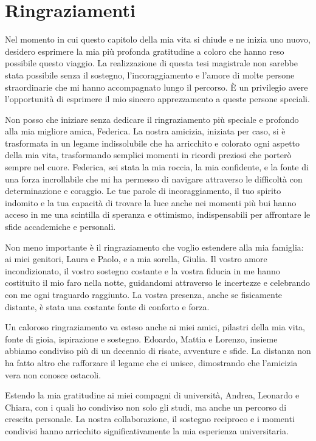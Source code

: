 \chapter*{Ringraziamenti}
\pagestyle{plain}

Nel momento in cui questo capitolo della mia vita si chiude e ne inizia uno nuovo, desidero esprimere la mia più profonda gratitudine a coloro che hanno reso possibile questo viaggio. La realizzazione di questa tesi magistrale non sarebbe stata possibile senza il sostegno, l'incoraggiamento e l'amore di molte persone straordinarie che mi hanno accompagnato lungo il percorso. È un privilegio avere l'opportunità di esprimere il mio sincero apprezzamento a queste persone speciali.

Non posso che iniziare senza dedicare il ringraziamento più speciale e profondo alla mia migliore amica, Federica. La nostra amicizia, iniziata per caso, si è trasformata in un legame indissolubile che ha arricchito e colorato ogni aspetto della mia vita, trasformando semplici momenti in ricordi preziosi che porterò sempre nel cuore. Federica, sei stata la mia roccia, la mia confidente, e la fonte di una forza incrollabile che mi ha permesso di navigare attraverso le difficoltà con determinazione e coraggio. Le tue parole di incoraggiamento, il tuo spirito indomito e la tua capacità di trovare la luce anche nei momenti più bui hanno acceso in me una scintilla di speranza e ottimismo, indispensabili per affrontare le sfide accademiche e personali.

Non meno importante è il ringraziamento che voglio estendere alla mia famiglia: ai miei genitori, Laura e Paolo, e a mia sorella, Giulia. Il vostro amore incondizionato, il vostro sostegno costante e la vostra fiducia in me hanno costituito il mio faro nella notte, guidandomi attraverso le incertezze e celebrando con me ogni traguardo raggiunto. La vostra presenza, anche se fisicamente distante, è stata una costante fonte di conforto e forza.

Un caloroso ringraziamento va esteso anche ai miei amici, pilastri della mia vita, fonte di gioia, ispirazione e sostegno. Edoardo, Mattia e Lorenzo, insieme abbiamo condiviso più di un decennio di risate, avventure e sfide. La distanza non ha fatto altro che rafforzare il legame che ci unisce, dimostrando che l'amicizia vera non conosce ostacoli.

Estendo la mia gratitudine ai miei compagni di università, Andrea, Leonardo e Chiara, con i quali ho condiviso non solo gli studi, ma anche un percorso di crescita personale. La nostra collaborazione, il sostegno reciproco e i momenti condivisi hanno arricchito significativamente la mia esperienza universitaria.

